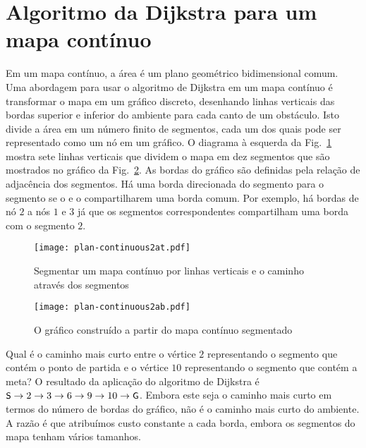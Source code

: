 \section{Algoritmo da Dijkstra para um mapa contínuo}\label{s.dijkstra-continuous}

Em um mapa contínuo, a área é um plano geométrico bidimensional comum. Uma abordagem para usar o algoritmo de Dijkstra em um mapa contínuo é transformar o mapa em um gráfico discreto, desenhando linhas verticais das bordas superior e inferior do ambiente para cada canto de um obstáculo. Isto divide a área em um número finito de segmentos, cada um dos quais pode ser representado como um nó em um gráfico. O diagrama à esquerda da Fig.~\ref{fig.map-graph-at} mostra sete linhas verticais que dividem o mapa em dez segmentos que são mostrados no gráfico da Fig.~\ref{fig.map-graph-ab}. As bordas do gráfico são definidas pela relação de adjacência dos segmentos. Há uma borda direcionada do segmento  para o segmento  se o  e o  compartilharem uma borda comum. Por exemplo, há bordas de nó $2$ a nós $1$ e $3$ já que os segmentos correspondentes compartilham uma borda com o segmento $2$.

\begin{figure}
\begin{center}
\texttt{[image: plan-continuous2at.pdf]}
\end{center}
\caption{Segmentar um mapa contínuo por linhas verticais e o caminho através dos segmentos}\label{fig.map-graph-at}
\end{figure}

\begin{figure}
\begin{center}
\texttt{[image: plan-continuous2ab.pdf]}
\end{center}
\caption{O gráfico construído a partir do mapa contínuo segmentado}\label{fig.map-graph-ab}
\end{figure}

Qual é o caminho mais curto entre o vértice $2$ representando o segmento que contém o ponto de partida e o vértice $10$ representando o segmento que contém a meta? O resultado da aplicação do algoritmo de Dijkstra é $\textsf{\small S} \rightarrow 2\rightarrow 3\rightarrow 6\rightarrow 9\rightarrow 10 \rightarrow \textsf{\small G}$. Embora este seja o caminho mais curto em termos do número de bordas do gráfico, não é o caminho mais curto do ambiente. A razão é que atribuímos custo constante a cada borda, embora os segmentos do mapa tenham vários tamanhos. 

